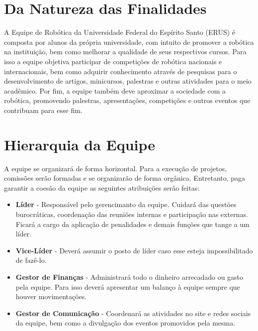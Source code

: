 \chapter{Da Natureza das Finalidades}
\label{chp:natureza}

A Equipe de Robótica da Universidade Federal do Espírito Santo (ERUS) é composta por alunos da própria universidade, com intuito de promover a robótica na instituição, bem como melhorar a qualidade de seus respectivos cursos. Para isso a equipe objetiva participar de competições de robótica nacionais e internacionais, bem como adquirir conhecimento através de pesquisas para o desenvolvimento de artigos, minicursos, palestras e outras atividades para o meio acadêmico. Por fim, a equipe também deve aproximar a sociedade com a robótica, promovendo palestras, apresentações, competições e outros eventos que contribuam para esse fim. 


\chapter{Hierarquia da Equipe}
\label{chp:hierarquia}

A equipe se organizará de forma horizontal. Para a execução de projetos, comissões serão formadas e se organizarão de forma orgânica. Entretanto, paga garantir a coesão da equipe as seguintes atribuições serão feitas:

\begin{itemize}
  \item[] \textbf{Líder} - Responsável pelo gerencimanto da equipe. Cuidará das questões burocráticas, coordenação das reuniões internas e participação nas externas. Ficará a cargo da aplicação de penalidades e demais funções que tange a um líder. 
  \item[] \textbf{Vice-Líder} - Deverá assumir o posto de líder caso esse esteja impossibilitado de fazê-lo.
  \item[] \textbf{Gestor de Finanças} - Administrará todo o dinheiro arrecadado ou gasto pela equipe. Para isso deverá apresentar um balanço à equipe sempre que houver movimentações.
  \item[] \textbf{Gestor de Comunicação} - Coordenará as atividades no site e redes sociais da equipe, bem como a divulgação dos eventos promovidos pela mesma.
\end{itemize}


